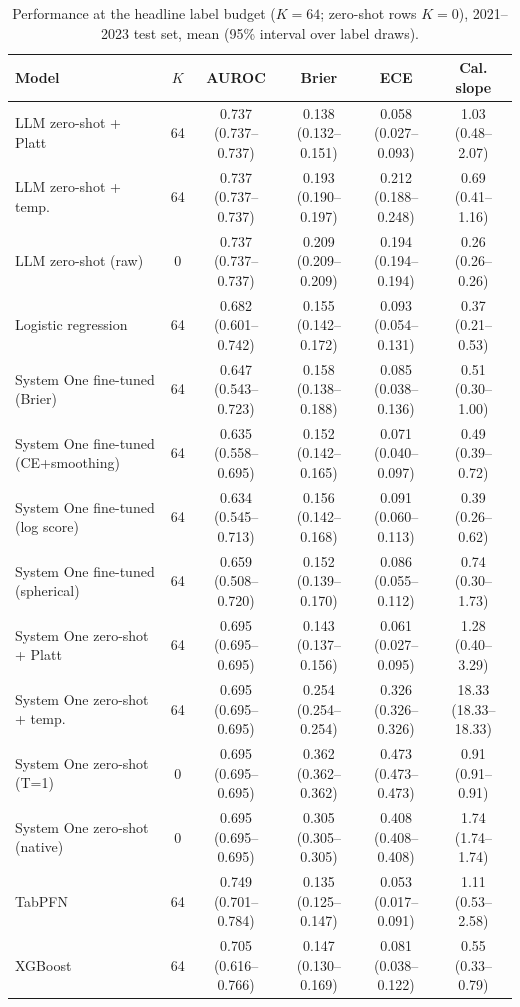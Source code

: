 \begin{table}[!t]
\caption{Performance at the headline label budget ($K{=}64$; zero-shot rows $K{=}0$), 2021--2023 test set, mean (95\% interval over label draws).}
\label{tab:main_T2}
\centering
\footnotesize
\begin{tabular}{lccccc}
\hline
Model & $K$ & AUROC & Brier & ECE & Cal. slope \\ \hline
LLM zero-shot + Platt & 64 & 0.737 (0.737--0.737) & 0.138 (0.132--0.151) & 0.058 (0.027--0.093) & 1.03 (0.48--2.07) \\
LLM zero-shot + temp. & 64 & 0.737 (0.737--0.737) & 0.193 (0.190--0.197) & 0.212 (0.188--0.248) & 0.69 (0.41--1.16) \\
LLM zero-shot (raw) & 0 & 0.737 (0.737--0.737) & 0.209 (0.209--0.209) & 0.194 (0.194--0.194) & 0.26 (0.26--0.26) \\
Logistic regression & 64 & 0.682 (0.601--0.742) & 0.155 (0.142--0.172) & 0.093 (0.054--0.131) & 0.37 (0.21--0.53) \\
System One fine-tuned (Brier) & 64 & 0.647 (0.543--0.723) & 0.158 (0.138--0.188) & 0.085 (0.038--0.136) & 0.51 (0.30--1.00) \\
System One fine-tuned (CE+smoothing) & 64 & 0.635 (0.558--0.695) & 0.152 (0.142--0.165) & 0.071 (0.040--0.097) & 0.49 (0.39--0.72) \\
System One fine-tuned (log score) & 64 & 0.634 (0.545--0.713) & 0.156 (0.142--0.168) & 0.091 (0.060--0.113) & 0.39 (0.26--0.62) \\
System One fine-tuned (spherical) & 64 & 0.659 (0.508--0.720) & 0.152 (0.139--0.170) & 0.086 (0.055--0.112) & 0.74 (0.30--1.73) \\
System One zero-shot + Platt & 64 & 0.695 (0.695--0.695) & 0.143 (0.137--0.156) & 0.061 (0.027--0.095) & 1.28 (0.40--3.29) \\
System One zero-shot + temp. & 64 & 0.695 (0.695--0.695) & 0.254 (0.254--0.254) & 0.326 (0.326--0.326) & 18.33 (18.33--18.33) \\
System One zero-shot (T=1) & 0 & 0.695 (0.695--0.695) & 0.362 (0.362--0.362) & 0.473 (0.473--0.473) & 0.91 (0.91--0.91) \\
System One zero-shot (native) & 0 & 0.695 (0.695--0.695) & 0.305 (0.305--0.305) & 0.408 (0.408--0.408) & 1.74 (1.74--1.74) \\
TabPFN & 64 & 0.749 (0.701--0.784) & 0.135 (0.125--0.147) & 0.053 (0.017--0.091) & 1.11 (0.53--2.58) \\
XGBoost & 64 & 0.705 (0.616--0.766) & 0.147 (0.130--0.169) & 0.081 (0.038--0.122) & 0.55 (0.33--0.79) \\
\hline
\end{tabular}
\end{table}
